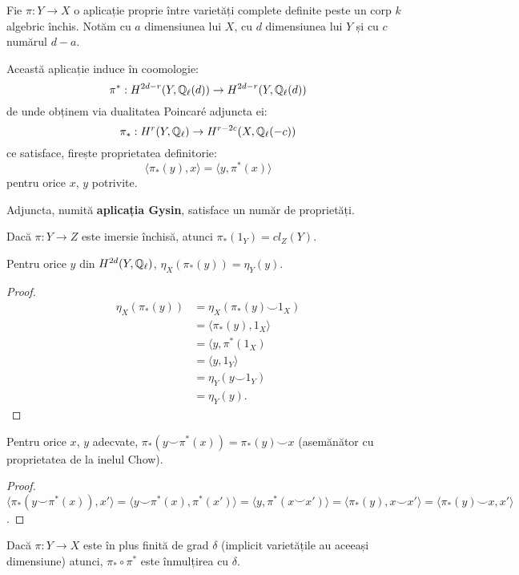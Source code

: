 \documentclass[13pt,openany,oneside]{book}
\begin{document}
Fie $\pi : Y \rightarrow X$ o aplicație proprie între varietăți complete definite peste un corp $k$ algebric închis. Notăm cu $a$ dimensiunea lui $X$, cu $d$ dimensiunea lui $Y$ și cu $c$ numărul $d-a$.

Această aplicație induce în coomologie:
$$\pi^*: H^{2d-r}(Y,\mathbb{Q}_\ell(d)) \rightarrow H^{2d-r}(Y,\mathbb{Q}_\ell(d))$$
de unde obținem via dualitatea Poincaré adjuncta ei:
$$\pi_* : H^r(Y,\mathbb{Q}_\ell) \rightarrow H^{r-2c}(X,\mathbb{Q}_\ell(-c))$$
ce satisface, firește proprietatea definitorie:
$$\langle \pi_*(y),x \rangle=\langle y,\pi^*(x)\rangle$$
pentru orice $x$, $y$ potrivite.

Adjuncta, numită {\bf aplicația Gysin}, satisface un număr de proprietăți.

\begin{propr}
Dacă $\pi : Y \rightarrow Z$ este imersie închisă, atunci $\pi_*(1_Y)=cl_Z(Y)$.
\end{propr}

\begin{propr}
Pentru orice $y$ din $H^{2d}(Y,\mathbb{Q}_\ell)$, $\eta_X(\pi_*(y))=\eta_Y(y)$.
\end{propr}

\begin{proof}
\begin{align*}
\eta_X(\pi_*(y))&=\eta_X(\pi_*(y)\smile 1_X)\\
&=\langle \pi_*(y), 1_X \rangle \\
&= \langle y, \pi^*(1_X) \\
&= \langle y, 1_Y \rangle \\
&= \eta_Y (y \smile 1_Y) \\
&= \eta_Y(y).
\end{align*}
\end{proof}

\begin{propr}
Pentru orice $x$, $y$ adecvate, $\pi_*(y \smile \pi^*(x)) = \pi_*(y) \smile x$ (asemănător cu proprietatea de la inelul Chow).
\end{propr}

\begin{proof}
$\langle \pi_*(y \smile \pi^*(x)), x' \rangle = \langle y \smile \pi^*(x), \pi^*(x') \rangle = \langle y, \pi^*(x \smile x') \rangle = \langle \pi_*(y),x\smile x' \rangle = \langle \pi_*(y) \smile x, x' \rangle$.
\end{proof}

\begin{propr}
Dacă $\pi:Y \rightarrow X$ este în plus finită de grad $\delta$ (implicit varietățile au aceeași dimensiune) atunci, $\pi_* \circ \pi^*$ este înmulțirea cu $\delta$.
\end{propr}
\end{document}
